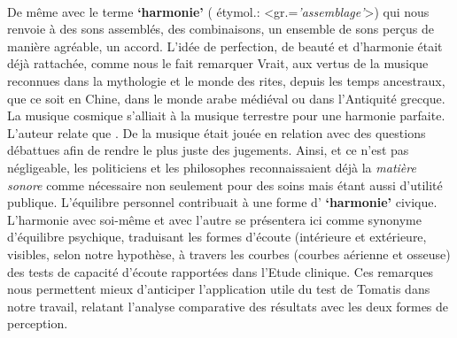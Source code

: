 \paragraph{}
De même avec le terme \textbf{`harmonie'} ( étymol.:
<gr.=\textit{'assemblage'}>) qui nous renvoie à
 des sons assemblés, des combinaisons, un ensemble de sons perçus de
 manière agréable, un accord. L'idée de perfection, de beauté et d'harmonie était déjà rattachée, comme nous le fait remarquer Vrait, aux  vertus de la musique reconnues dans la mythologie et le
 monde des rites, depuis les temps ancestraux, que ce soit en Chine, dans le monde arabe
 médiéval ou dans l'Antiquité grecque. La musique cosmique s'alliait  à la musique terrestre pour une harmonie parfaite.
 L'auteur relate que  \autocite[80]{vrait_musicotherapie_2018}. De la musique était jouée en relation avec des questions débattues afin de rendre le plus juste des jugements.
Ainsi, et ce n'est pas négligeable, les  politiciens  et les
philosophes reconnaissaient déjà la \textit{matière sonore} comme nécessaire non seulement pour  des soins mais étant aussi d'utilité
publique.
 L'équilibre personnel contribuait à une forme d' \textbf{`harmonie'} civique.
L'harmonie avec soi-même et avec l'autre se présentera ici comme synonyme d'équilibre
psychique, traduisant les formes d'écoute (intérieure et
extérieure, visibles, selon notre hypothèse,
 à travers les courbes (courbes aérienne et osseuse) des tests de capacité d'écoute rapportées
dans l'Etude clinique.
Ces remarques nous permettent mieux d'anticiper
l'application utile du test de Tomatis dans notre travail, relatant l'analyse
comparative des résultats avec les deux formes de perception.


